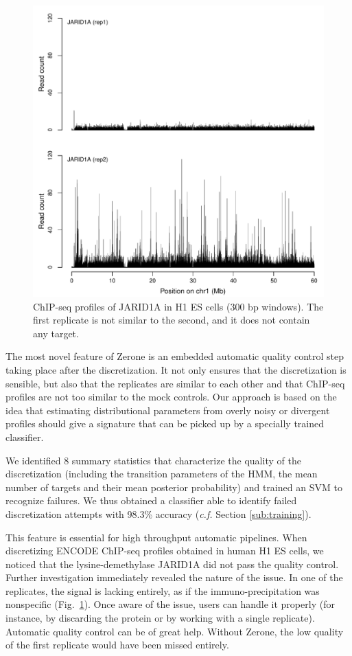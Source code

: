 \documentclass{bioinfo}
\begin{document}
\begin{figure}[!tpb]
\centerline{\includegraphics[scale=0.5]{jarid.pdf}}
\caption{
  ChIP-seq profiles of JARID1A in H1 ES cells (300 bp windows).
  The first replicate is not similar to the second, and it does not
  contain any target.
}\label{fig:jarid}
\end{figure}

The most novel feature of Zerone is an embedded automatic quality
control step taking place after the discretization. It not only
ensures that the discretization is sensible, but also that the
replicates are similar to each other and that ChIP-seq profiles
are not too similar to the mock controls. Our approach is based
on the idea that estimating distributional parameters from
overly noisy or divergent profiles should give a signature that
can be picked up by a specially trained classifier.

We identified 8 summary statistics that characterize the quality of
the discretization (including the transition parameters of the HMM,
the mean number of targets and their mean posterior probability)
and trained an SVM to recognize failures. We thus obtained a
classifier able to identify failed discretization attempts
with 98.3\% accuracy (\textit{c.f.} Section \ref{sub:training}).

This feature is essential for high throughput automatic pipelines.
When discretizing ENCODE ChIP-seq profiles obtained in human H1
ES cells, we noticed that the lysine-demethylase JARID1A did
not pass the quality control.
Further investigation immediately revealed the nature of the issue.
In one of the replicates, the signal is lacking entirely, as if
the immuno-precipitation was nonspecific (Fig.~\ref{fig:jarid}).
Once aware of the issue, users can handle it properly (for instance,
by discarding the protein or by working with a single replicate).
Automatic quality control can be of great help. Without Zerone,
the low quality of the first replicate would have been missed
entirely.
\end{document}
